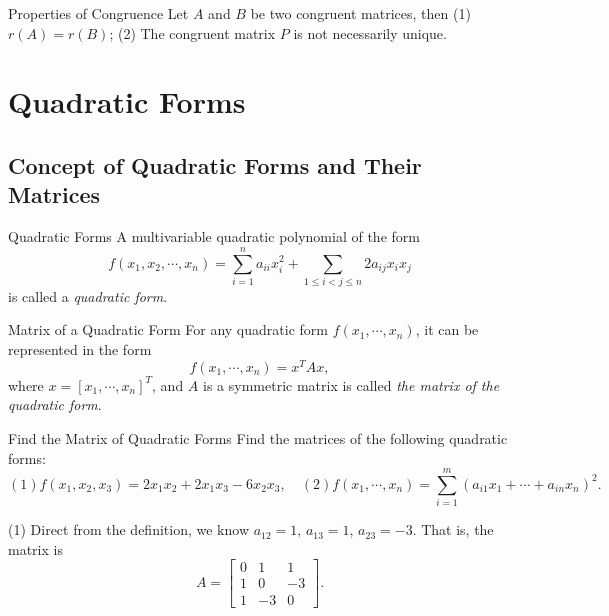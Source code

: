 \begin{proposition}{Properties of Congruence}{}
  Let $A$ and $B$ be two congruent matrices,
  then (1) $r(A) = r(B)$; (2) The congruent matrix $P$ is not necessarily unique.
\end{proposition}

\section{Quadratic Forms}

\subsection{Concept of Quadratic Forms and Their Matrices}

\begin{definition}{Quadratic Forms}{}
  A multivariable quadratic polynomial of the form
  \begin{equation}
    f(x_1,x_2,\cdots,x_n) = \sum\limits_{i = 1}^n a_{ii}x_i^2 + \sum\limits_{1 \leq i < j \leq n} 2a_{ij}x_ix_j
  \end{equation}
  is called a \emph{quadratic form}.
\end{definition}

\begin{definition}{Matrix of a Quadratic Form}{}
  For any quadratic form $f(x_1,\cdots,x_n)$,
  it can be represented in the form
  \begin{equation}
    f(x_1,\cdots,x_n) = x^TAx,
  \end{equation}
  where $x = [x_1,\cdots,x_n]^T$,
  and $A$ is a symmetric matrix is called \emph{the matrix of the quadratic
    form}.
\end{definition}

\begin{example}{Find the Matrix of Quadratic Forms}{}
  Find the matrices of the following quadratic forms:
  \begin{equation}
    (1) f(x_1, x_2, x_3) = 2x_1x_2 + 2x_1x_3 - 6x_2x_3, \quad
    (2) f(x_1,\cdots,x_n) = \sum\limits_{i = 1}^m (a_{i1}x_1 + \cdots + a_{in}x_n)^2.
  \end{equation}
\end{example}

\begin{solution}
  (1) Direct from the definition, we know $a_{12} = 1$, $a_{13} = 1$, $a_{23} = -3$.
  That is, the matrix is
  \begin{equation}
    A = \left[
      \begin{array}{ccc}
        0&1&1\\
        1&0&-3\\
        1&-3&0
      \end{array}
    \right].
  \end{equation}
\end{solution}

